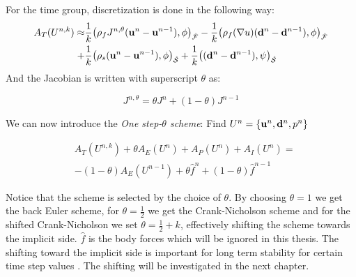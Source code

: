 For the time group, discretization is done in the following way:
\begin{align}
A_T(U^{n,k}) \approx & \frac{1}{k} \big( \rho_f J^{n,\theta} (\bold{u}^n - \bold{u}^{n-1}) , \phi  \big)_{\mathcal{\hat{F}}} - \frac{1}{k} \big( \rho_f (\nabla u ) (\bold{d}^n - \bold{d}^{n-1}) , \phi \big)_{\mathcal{\hat{F}}} \\
+ & \frac{1}{k} \big( \rho_s  (\bold{u}^n - \bold{u}^{n-1}) , \phi  \big)_{\mathcal{\hat{S}}} +  \frac{1}{k} \big( (\bold{d}^n - \bold{d}^{n-1}) , \psi  \big)_{\mathcal{\hat{S}}}
\end{align}
And the Jacobian is written with superscript $\theta$ as:

\begin{equation}
J^{n, \theta} = \theta J^n + (1-\theta)J^{n-1}
\end{equation}

We can now introduce the \textit{One step-$\theta$ scheme}: 
Find $U^n = \{\bold{u}^n , \bold{d}^n, p^n \}$

\begin{align}
& A_T(U^{n,k}) + \theta A_E(U^{n}) + A_P(U^{n}) + A_I(U^{n}) = \\
& - (1-\theta) A_E(U^{n-1}) + \theta \hat{f}^n + (1-\theta) \hat{f}^{n-1}  
\end{align}

Notice that the scheme is selected by the choice of $\theta $. By choosing $ \theta = 1$ we get the back Euler scheme, for $ \theta = \frac{1}{2}$ we get the Crank-Nicholson scheme and for the shifted Crank-Nicholson we set $ \theta = \frac{1}{2} + k$, effectively shifting the scheme towards the implicit side. $\hat{f}$ is the body forces which will be ignored in this thesis. The shifting toward the implicit side is important for long term stability for certain time step values \cite{Wick2011}. The shifting will be investigated in the next chapter.





